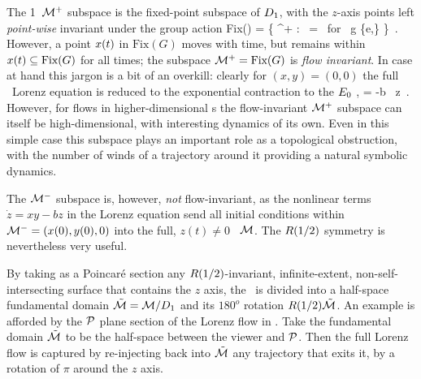 The 1\dmn\ ${\cal M}^+$ subspace is
the fixed-point subspace of $D_1$, with the $z$-axis
points left \emph{point-wise} invariant under the group
action
\beq
\mbox{Fix}(\Ztwo) =
   \{ \ssp \in \pS^+ :  \, \ssp = \ssp \mbox{ for } g \in \{e,\} \}
\,.
However, a point $x(t)$ in $\mbox{Fix}(G)$ moves with time,
but remains within $x(t) \subseteq \mbox{Fix}(G)$ for all
times; the  subspace ${\cal M}^+ = \mbox{Fix}(G)$ is {\em flow
invariant}. In case at hand this jargon is a bit of an
overkill: clearly for $(x,y)=(0,0)$ the full \statesp\ Lorenz
equation  is reduced to the exponential
contraction to the $E_{0}$ \eqv,
\beq
{} = -b \, z
\,.
However, for flows in higher-dimensional \statesp s the
flow-invariant ${\cal M}^+$ subspace can itself be high-dimensional, with
interesting dynamics of its own.
Even in this simple case this subspace plays an important role
as a topological obstruction, with
the number of winds of a trajectory around it providing
a natural symbolic dynamics.

The ${\cal M}^-$ subspace is, however, {\em not} flow-invariant, as the nonlinear
terms $\dot{z}=xy - bz$ in the Lorenz equation 
send all initial conditions within
${\cal M}^-=(x(0),y(0),0)$ into the full, $z(t) \neq 0$ \statesp\  ${\cal M}$.
The $R(1/2)$ symmetry is nevertheless very useful.

By taking as a Poincar\'e section %
any  $R(1/2)$-invariant, infinite-extent, non-self-inter\-sect\-ing
surface that contains the
$z$ axis, the \statesp\ is divided into a half-space fundamental
domain $\tilde{{\cal M}}={\cal M}/D_1$ and its $180^o$ rotation $R(1/2)\tilde{{\cal M}}$.
An example is afforded by the ${\cal P}$ plane section of
the Lorenz flow in . Take
the  fundamental domain $\tilde{{\cal M}}$ to be the half-space between the
viewer and ${\cal P}$. Then the full Lorenz
flow is captured by re-injecting back into $\tilde{{\cal M}}$
any trajectory that exits it, by a rotation of $\pi$ around the $z$ axis.

